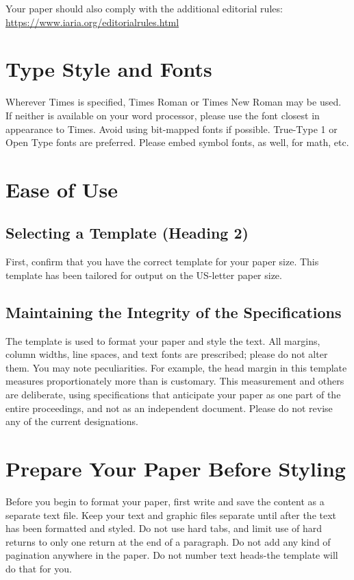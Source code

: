 \documentclass[conference,flushend]{iaria-lite}
\begin{document}
Your paper should also comply with the additional  editorial rules:
\url{https://www.iaria.org/editorialrules.html} \faWarning{}

\section{Type Style and Fonts}
Wherever Times is specified, Times Roman or Times New Roman may be used. If neither is available on your word processor, please use the font closest in appearance to Times. Avoid using bit-mapped fonts if possible. True-Type 1 or Open Type fonts are preferred. Please embed symbol fonts, as well, for math, etc.

\section{Ease of Use}

\subsection{Selecting a Template (Heading 2)}
First, confirm that you have the correct template for your paper size. This template has been tailored for output on the US-letter paper size.

\subsection{Maintaining the Integrity of the Specifications}
The template is used to format your paper and style the text. All margins, column widths, line spaces, and text fonts are prescribed; please do not alter them. You may note peculiarities. For example, the head margin in this template measures proportionately more than is customary. This measurement and others are deliberate, using specifications that anticipate your paper as one part of the entire proceedings, and not as an independent document. Please do not revise any of the current designations.

\section{Prepare Your Paper Before Styling}

Before you begin to format your paper, first write and save the content as a separate text file. Keep your text and graphic files separate until after the text has been formatted and styled. Do not use hard tabs, and limit use of hard returns to only one return at the end of a paragraph. Do not add any kind of pagination anywhere in the paper. Do not number text heads-the template will do that for you.
\end{document}
